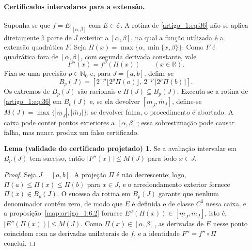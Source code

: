 \documentclass[12pt,a4paper]{article}
\theoremstyle{preciso}
\theoremstyle{definition}
\newcommand{\R}{\mathbb R}
\newcommand{\EE}{\mathcal E}
\newcommand{\Nzero}{\mathbb{N}_0}
\theoremstyle{preciso}
\theoremstyle{preciso}
\theoremstyle{preciso}
\theoremstyle{preciso}
\theoremstyle{definition}
\theoremstyle{preciso}
\theoremstyle{definition}
\theoremstyle{preciso}
\theoremstyle{preciso}
\newtheorem*{lemaSN}{Lema (validade do certificado projetado)}
\theoremstyle{definition}
\begin{document}
\paragraph{Certificados intervalares para a extensão.}
Suponha-se que $f=E|_{[\alpha,\beta]}$ com $E\in\EE$. A rotina de \eqref{artigo_1:eq:36} não se aplica diretamente à parte de $J$ exterior a $[\alpha,\beta]$, na qual a função utilizada é a extensão quadrática $F$. Seja $\Pi(x)=\max\{\alpha,\min\{x,\beta\}\}$. Como $F$ é quadrática fora de $[\alpha,\beta]$, com segunda derivada constante, vale
\[
F''(x)=f''(\Pi(x))\qquad(x\in\R).
\]
Fixa-se uma precisão $p\in\Nzero$ e, para $J=[a,b]$, define-se
\[
B_p(J)=\left[2^{-p}\lfloor2^p\Pi(a)\rfloor,\ 2^{-p}\lceil2^p\Pi(b)\rceil\right].
\]
Os extremos de $B_p(J)$ são racionais e $\Pi(J)\subseteq B_p(J)$. Executa-se a rotina de \eqref{artigo_1:eq:36} em $B_p(J)$ e, se ela devolver $[\underline m_J,\overline m_J]$, define-se $M(J)=\max\{|\underline m_J|,|\overline m_J|\}$; se devolver falha, o procedimento é abortado. A caixa pode conter pontos exteriores a $[\alpha,\beta]$; essa sobrestimação pode causar falha, mas nunca produz um falso certificado.
\begin{lemaSN}
Se a avaliação intervalar em $B_p(J)$ tem sucesso, então $|F''(x)|\le M(J)$ para todo $x\in J$.
\end{lemaSN}
\begin{proof}
Seja $J=[a,b]$. A projeção $\Pi$ é não decrescente; logo, $\Pi(a)\le\Pi(x)\le\Pi(b)$ para $x\in J$, e o arredondamento exterior fornece $\Pi(x)\in B_p(J)$. O sucesso da rotina em $B_p(J)$ garante que nenhum denominador contém zero, de modo que $E$ é definida e de classe $C^2$ nessa caixa, e a proposição~\ref{map:artigo_1:6.2} fornece $E''(\Pi(x))\in[\underline m_J,\overline m_J]$, isto é, $|E''(\Pi(x))|\le M(J)$. Como $\Pi(x)\in[\alpha,\beta]$, as derivadas de $E$ nesse ponto coincidem com as derivadas unilaterais de $f$, e a identidade $F''=f''\circ\Pi$ conclui.
\end{proof}
\end{document}
